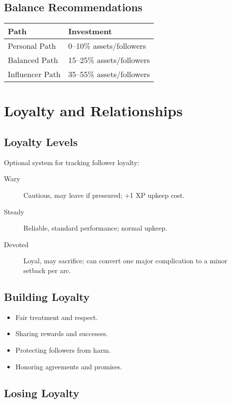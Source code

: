 \documentclass[11pt,twoside,openany]{book}
\begin{document}
\subsection*{Balance Recommendations}

\begin{center}
\begin{tabular}{|l|l|}
\hline
\textbf{Path} & \textbf{Investment} \\
\hline
Personal Path & 0–10\% assets/followers \\
Balanced Path & 15–25\% assets/followers \\
Influencer Path & 35–55\% assets/followers \\
\hline
\end{tabular}
\end{center}

\section*{Loyalty and Relationships} 

\subsection*{Loyalty Levels}

Optional system for tracking follower loyalty:
\begin{description}
\item[Wary] Cautious, may leave if pressured; +1 XP upkeep cost.
\item[Steady] Reliable, standard performance; normal upkeep.
\item[Devoted] Loyal, may sacrifice; can convert one major complication to a minor setback per arc.
\end{description}

\subsection*{Building Loyalty}

\begin{itemize}
\item Fair treatment and respect.
\item Sharing rewards and successes.
\item Protecting followers from harm.
\item Honoring agreements and promises.
\end{itemize}

\subsection*{Losing Loyalty}
\end{document}
